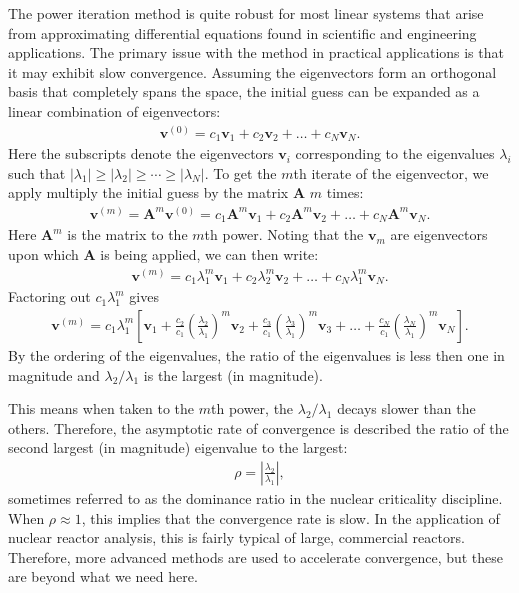 The power iteration method is quite robust for most linear systems that arise from approximating differential equations found in scientific and engineering applications. The primary issue with the method in practical applications is that it may exhibit slow convergence. Assuming the eigenvectors form an orthogonal basis that completely spans the space, the initial guess can be expanded as a linear combination of eigenvectors:
\begin{align}
  \mathbf{v}^{(0)} = c_1 \mathbf{v}_1 + c_2 \mathbf{v}_2 + \ldots + c_N \mathbf{v}_N .
\end{align}
Here the subscripts denote the eigenvectors $\mathbf{v}_i$ corresponding to the eigenvalues $\lambda_i$ such that $| \lambda_1 | \ge | \lambda_2 | \ge \cdots \ge | \lambda_N |$. To get the $m$th iterate of the eigenvector, we apply multiply the initial guess by the matrix $\mathbf{A}$ $m$ times:
\begin{align}
  \mathbf{v}^{(m)} = \mathbf{A}^m \mathbf{v}^{(0)} = c_1 \mathbf{A}^m \mathbf{v}_1 + c_2 \mathbf{A}^m \mathbf{v}_2 + \ldots + c_N \mathbf{A}^m \mathbf{v}_N .
\end{align}
Here $\mathbf{A}^m$ is the matrix to the $m$th power. Noting that the $\mathbf{v}_m$ are eigenvectors upon which $\mathbf{A}$ is being applied, we can then write:
\begin{align}
  \mathbf{v}^{(m)} = c_1 \lambda_1^m \mathbf{v}_1 + c_2 \lambda_2^m \mathbf{v}_2 + \ldots + c_N \lambda_1^m \mathbf{v}_N .
\end{align}
Factoring out $c_1 \lambda_1^m$ gives
\begin{align}
  \mathbf{v}^{(m)} = c_1 \lambda_1^m \left[ \mathbf{v}_1 + \frac{c_2}{c_1} \left( \frac{\lambda_2}{\lambda_1} \right)^m \mathbf{v}_2 + \frac{c_3}{c_1} \left( \frac{\lambda_3}{\lambda_1} \right)^m \mathbf{v}_3 + \ldots + \frac{c_N}{c_1} \left( \frac{\lambda_N}{\lambda_1} \right)^m\mathbf{v}_N \right].
\end{align}
By the ordering of the eigenvalues, the ratio of the eigenvalues is less then one in magnitude and $\lambda_2 / \lambda_1$ is the largest (in magnitude). 

This means when taken to the $m$th power, the $\lambda_2 / \lambda_1$ decays slower than the others. Therefore, the asymptotic rate of convergence is described the ratio of the second largest (in magnitude) eigenvalue to the largest:
\begin{align}
  \rho = \left| \frac{\lambda_2}{\lambda_1} \right| ,
\end{align}
sometimes referred to as the dominance ratio in the nuclear criticality discipline. When $\rho \approx 1$, this implies that the convergence rate is slow. In the application of nuclear reactor analysis, this is fairly typical of large, commercial reactors. Therefore, more advanced methods are used to accelerate convergence, but these are beyond what we need here.

